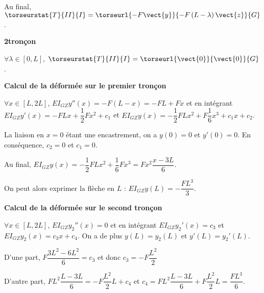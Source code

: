 Au final, $\torseurstat{T}{II}{I} = \torseurl{-F\vect{y}}{-F\left(L-\lambda\right) \vect{z}}{G}$.

\textbf{2\ieme tronçon}

$\forall \lambda \in [0,L]$, $\torseurstat{T}{II}{I} = \torseurl{\vect{0}}{\vect{0}}{G}$.

\textbf{Calcul de la déformée sur le premier tronçon}

 $\forall x \in [L,2L]$, $EI_{GZ}y''(x)=-F\left(L-x\right) =-FL + Fx $ 
et en intégrant $EI_{GZ}y'(x)= -FLx +\dfrac{1}{2}Fx^2+ c_1$ et  $EI_{GZ}y(x)= -\dfrac{1}{2}FLx^2 +F \dfrac{1}{6}x^3+ c_1x + c_2$.


La liaison en $x=0$ étant une encastrement, on a $y(0)=0$ et $y'(0)=0$. 
En conséquence, $c_2=0 $ et $c_1=0$.

Au final, $EI_{GZ}y(x)= -\dfrac{1}{2}FLx^2 + \dfrac{1}{6}Fx^3 = Fx^2\dfrac{x - 3L}{6}$.


On peut alors exprimer la flèche en $L$ : $EI_{GZ}y(L)= -\dfrac{ FL^3}{3}$.

\textbf{Calcul de la déformée sur le second tronçon}

$\forall x \in [L,2L]$, $EI_{GZ}y_2''(x)=0$ et en intégrant $EI_{GZ}y_2'(x)=c_3$ et $EI_{GZ}y_2(x)=c_3x + c_4$. 
On a de plus $y(L) = y_2(L)$ et $y'(L) = y_2'(L)$. 

D'une part, $F\dfrac{3L^2- 6L^2}{6}=c_3 $ et donc $c_3 =  -F\dfrac{ L^2}{2} $

D'autre part, $FL^2\dfrac{L - 3L}{6}=-F\dfrac{ L^2}{2} L + c_4$ et $c_4 =  FL^2\dfrac{L - 3L}{6}+F\dfrac{ L^2}{2} L  = \dfrac{FL^3}{6}$.






\else

\fi

\ifprof
\else
\fi



\ifprof
\begin{figure}[H]
\centering
\end{figure}
\else



\fi